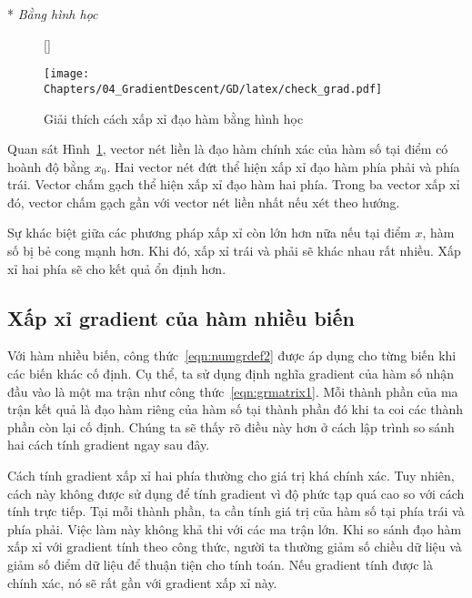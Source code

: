 \newpage 
* \textit{Bằng hình học }

\begin{figure}[t]
    [\FBwidth]
    {\caption{
    Giải thích cách xấp xỉ đạo hàm bằng hình học
    }
    \label{fig:explain_numgrad}}
    { %
    \texttt{[image: Chapters/04\_GradientDescent/GD/latex/check\_grad.pdf]}
    }
\end{figure}

Quan sát Hình~\ref{fig:explain_numgrad}, vector nét liền là đạo hàm {chính xác}
của hàm số tại điểm có hoành độ bằng $x_0$. Hai vector nét đứt thể hiện xấp xỉ
đạo hàm phía phải và phía trái. Vector chấm gạch thể hiện xấp xỉ đạo hàm hai
phía. Trong ba vector xấp xỉ đó, vector chấm gạch gần với vector nét liền nhất
nếu xét theo hướng.

Sự khác biệt giữa các phương pháp xấp xỉ còn lớn hơn nữa nếu tại điểm $x$, hàm số bị
{bẻ cong} mạnh hơn. Khi đó, xấp xỉ trái và phải sẽ khác nhau rất nhiều.
Xấp xỉ hai phía sẽ cho kết quả ổn định hơn.


\subsection{Xấp xỉ gradient của hàm nhiều biến}

Với hàm nhiều biến, công thức~\eqref{eqn:numgrdef2} được áp dụng cho từng biến
khi các biến khác cố định. Cụ thể, ta sử dụng định nghĩa gradient của hàm số nhận
đầu vào là một ma trận như công thức~\eqref{eqn:grmatrix1}. Mỗi thành phần của
ma trận kết quả là đạo hàm riêng của hàm số tại thành phần đó khi ta coi các thành
phần còn lại cố định. Chúng ta sẽ thấy rõ điều này hơn ở cách lập trình so sánh
hai cách tính gradient ngay sau đây.

Cách tính gradient xấp xỉ hai phía thường cho giá trị khá chính xác. Tuy nhiên,
cách này không được sử dụng để tính gradient vì độ phức tạp quá cao so với cách
tính trực tiếp. Tại mỗi thành phần, ta cần tính giá trị của hàm số tại phía trái
và phía phải. Việc làm này không khả thi với các ma trận lớn. Khi so sánh đạo
hàm xấp xỉ với gradient tính theo công thức, người ta thường giảm số chiều dữ
liệu và giảm số điểm dữ liệu để thuận tiện cho tính toán. Nếu gradient tính được
là chính xác, nó sẽ rất gần với gradient xấp xỉ này.

